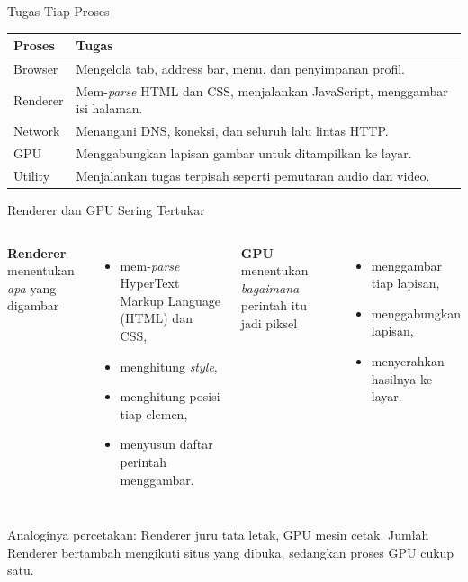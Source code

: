 \documentclass[aspectratio=169, table, 12pt]{beamer}
\begin{document}
\begin{frame}{{\Large Tugas Tiap Proses}}
  \vspace{8pt}
  \centering
  {\small
  \begin{tabularx}{0.95\textwidth}{lX}
    \hline
    \textbf{Proses} & \textbf{Tugas} \\
    \hline
    Browser & Mengelola tab, address bar, menu, dan penyimpanan profil. \\
    \hline
    Renderer & Mem-\textit{parse} HTML dan CSS, menjalankan JavaScript, menggambar isi halaman. \\
    \hline
    Network & Menangani DNS, koneksi, dan seluruh lalu lintas HTTP. \\
    \hline
    GPU & Menggabungkan lapisan gambar untuk ditampilkan ke layar. \\
    \hline
    Utility & Menjalankan tugas terpisah seperti pemutaran audio dan video. \\
    \hline
  \end{tabularx}}
\end{frame}

\begin{frame}{{\Large Renderer dan GPU Sering Tertukar}}
  \vspace{10pt}
  \begin{columns}[t]
    \textbf{Renderer} menentukan \emph{apa} yang digambar
    \vspace{4pt}
    \begin{itemize}
      \item mem-\textit{parse} HyperText Markup Language (HTML) dan CSS,
      \item menghitung \textit{style},
      \item menghitung posisi tiap elemen,
      \item menyusun daftar perintah menggambar.
    \end{itemize}

    \textbf{GPU} menentukan \emph{bagaimana} perintah itu jadi piksel
    \vspace{4pt}
    \begin{itemize}
      \item menggambar tiap lapisan,
      \item menggabungkan lapisan,
      \item menyerahkan hasilnya ke layar.
    \end{itemize}
  \end{columns}

  \vspace{10pt}
  {\footnotesize Analoginya percetakan: Renderer juru tata letak, GPU mesin
  cetak. Jumlah Renderer bertambah mengikuti situs yang dibuka, sedangkan
  proses GPU cukup satu.}
\end{frame}
\end{document}
